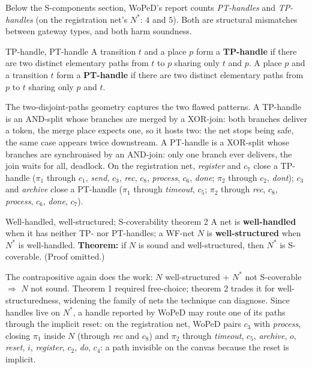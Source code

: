 Below the S-components section, WoPeD's report counts \emph{PT-handles} and \emph{TP-handles} (on the registration net's $N^{*}$: $4$ and $5$). Both are structural mismatches between gateway types, and both harm soundness.
\begin{definitionbox}{TP-handle, PT-handle}
A transition $t$ and a place $p$ form a \textbf{TP-handle} if there are two distinct elementary paths from $t$ to $p$ sharing only $t$ and $p$. A place $p$ and a transition $t$ form a \textbf{PT-handle} if there are two distinct elementary paths from $p$ to $t$ sharing only $p$ and $t$.
\end{definitionbox}
The two-disjoint-paths geometry captures the two flawed patterns. A TP-handle is an AND-split whose branches are merged by a XOR-join: both branches deliver a token, the merge place expects one, so it hosts two: the net stops being safe, the same case appears twice downstream. A PT-handle is a XOR-split whose branches are synchronised by an AND-join: only one branch ever delivers, the join waits for all, deadlock. On the registration net, \emph{register} and $c_7$ close a TP-handle ($\pi_1$ through $c_1$, \emph{send}, $c_3$, \emph{rec}, $c_8$, \emph{process}, $c_6$, \emph{done}; $\pi_2$ through $c_2$, \emph{dont}); $c_3$ and \emph{archive} close a PT-handle ($\pi_1$ through \emph{timeout}, $c_5$; $\pi_2$ through \emph{rec}, $c_8$, \emph{process}, $c_6$, \emph{done}, $c_7$).
\begin{definitionbox}{Well-handled, well-structured; S-coverability theorem 2}
A net is \textbf{well-handled} when it has neither TP- nor PT-handles; a WF-net $N$ is \textbf{well-structured} when $N^{*}$ is well-handled. \textbf{Theorem:} if $N$ is sound and well-structured, then $N^{*}$ is S-coverable. (Proof omitted.)
\end{definitionbox}
The contrapositive again does the work: $N$ well-structured $+$ $N^{*}$ not S-coverable $\Rightarrow$ $N$ not sound. Theorem 1 required free-choice; theorem 2 trades it for well-structuredness, widening the family of nets the technique can diagnose. Since handles live on $N^{*}$, a handle reported by WoPeD may route one of its paths through the implicit reset: on the registration net, WoPeD pairs $c_3$ with \emph{process}, closing $\pi_1$ inside $N$ (through \emph{rec} and $c_8$) and $\pi_2$ through \emph{timeout}, $c_5$, \emph{archive}, $o$, \emph{reset}, $i$, \emph{register}, $c_2$, \emph{do}, $c_4$: a path invisible on the canvas because the reset is implicit.

